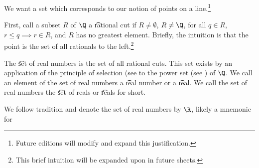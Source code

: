 

We want a set which corresponds to our notion of points on a line.\footnote{Future editions will modify and expand this justification.}


First, call a subset $R$ of $\Q$ a \t{rational cut} if $R \neq \emptyset$, $R \neq \Q$, for all $q \in R$, $r \leq q \implies r \in R$, and $R$ has no greatest element.
Briefly, the intuition is that the point is the set of all rationals to the left.\footnote{This brief intuition will be expanded upon in future sheets.}

The \t{set of real numbers} is the set of all rational cuts.
This set exists by an application of the principle of selection (see  to the power set (see ) of $\Q$.
We call an element of the set of real numbers a \t{real number} or a \t{real}.
We call the set of real numbers the \t{set of reals} or \t{reals} for short.


We follow tradition and denote the set of real numbers by $\R$, likely a mnemonic for 

\blankpage

